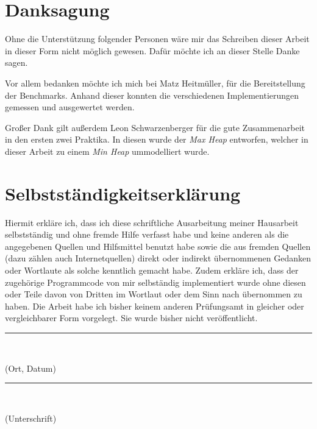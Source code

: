 \section*{Danksagung}

Ohne die Unterstützung folgender Personen wäre mir das Schreiben dieser Arbeit in dieser Form nicht möglich gewesen. Dafür möchte ich an dieser Stelle Danke sagen.

Vor allem bedanken möchte ich mich bei Matz Heitmüller, für die Bereitstellung der Benchmarks. Anhand dieser konnten die verschiedenen Implementierungen gemessen und ausgewertet werden.

Großer Dank gilt außerdem Leon Schwarzenberger für die gute Zusammenarbeit in den ersten zwei Praktika. In diesen wurde der \textit{Max Heap} entworfen, welcher in dieser Arbeit zu einem \textit{Min Heap} ummodelliert wurde.

\section*{Selbstständigkeitserklärung}

Hiermit erkläre ich, dass ich diese schriftliche Ausarbeitung meiner Hausarbeit selbstständig und ohne fremde Hilfe verfasst habe und keine anderen als die angegebenen Quellen und Hilfsmittel benutzt habe sowie die aus fremden Quellen (dazu zählen auch Internetquellen) direkt oder indirekt übernommenen Gedanken oder Wortlaute als solche kenntlich gemacht habe. Zudem erkläre ich, dass der zugehörige Programmcode von mir selbständig implementiert wurde ohne diesen oder Teile davon von Dritten im Wortlaut oder dem Sinn nach übernommen zu haben. Die Arbeit habe ich bisher keinem anderen Prüfungsamt in gleicher oder vergleichbarer Form vorgelegt. Sie wurde bisher nicht veröffentlicht.\\

\vspace{1cm}
\parbox{4cm}{%
\rule{4cm}{0.5pt}\\
\centerline{(Ort, Datum)}%
}\hfill
\parbox{5cm}{%
\rule{5cm}{0.5pt}\\
\centerline{(Unterschrift)}%
}